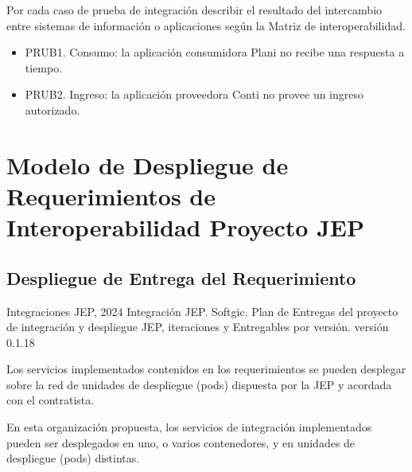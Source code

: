 \documentclass[
  paper=a4,
  ,captions=tableheading
]{scrartcl}
\providecommand{\tightlist}{%
  \setlength{\itemsep}{0pt}\setlength{\parskip}{0pt}}
\renewenvironment{quote}{\begin{customblockquote}\list{}{\rightmargin=0em\leftmargin=0em}%
\item\relax\color{blockquote-text}\ignorespaces}{\unskip\unskip\endlist\end{customblockquote}}
\begin{document}
Por cada caso de prueba de integración describir el resultado del
intercambio entre sistemas de información o aplicaciones según la Matriz
de interoperabilidad.

\begin{itemize}
\tightlist
\item
  PRUB1. Consumo: la aplicación consumidora Plani no recibe una
  respuesta a tiempo.
\item
  PRUB2. Ingreso: la aplicación proveedora Conti no provee un ingreso
  autorizado.
\end{itemize}

\newpage

\section{Modelo de Despliegue de Requerimientos de Interoperabilidad
Proyecto
JEP}\label{sec:modelo-de-despliegue-de-requerimientos-de-interoperabilidad-proyecto-jep}

\subsection{Despliegue de Entrega del
Requerimiento}\label{sec:despliegue-de-entrega-del-requerimiento}

\begin{quote}
Integraciones JEP, 2024 Integración JEP. Softgic. Plan de Entregas del
proyecto de integración y despliegue JEP, iteraciones y Entregables por
versión. versión 0.1.18
\end{quote}

Los servicios implementados contenidos en los requerimientos se pueden
desplegar sobre la red de unidades de despliegue (pods) dispuesta por la
JEP y acordada con el contratista.

En esta organización propuesta, los servicios de integración
implementados pueden ser desplegados en uno, o varios contenedores, y en
unidades de despliegue (pods) distintas.
\end{document}
